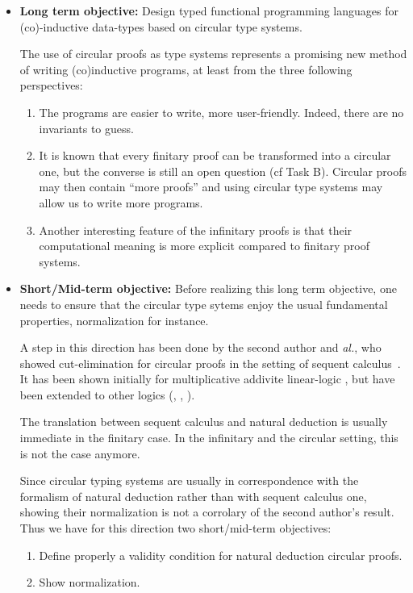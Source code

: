 \begin{itemize}
\item \textbf{Long term objective:} Design typed functional programming languages for (co)-inductive data-types based on circular type systems.

  \bigskip
The use of circular proofs as type systems represents a promising new
method of writing (co)inductive programs, at least from the three following perspectives:
  
\begin{enumerate}
\item The programs are easier to write, more user-friendly. Indeed, there are no invariants to guess.
\item It is known that every finitary proof can be transformed into a circular one, but the converse is still an open question (cf Task B).
Circular proofs may then contain ``more proofs'' and using circular type systems may allow us to write more programs.
  \item Another interesting feature of the infinitary proofs is that their computational meaning is more explicit compared to finitary proof systems.
\end{enumerate}

  
\item \textbf{Short/Mid-term objective:} Before realizing this long term objective, one needs to ensure that the circular type sytems
  enjoy the usual fundamental properties, normalization for instance.

  A step in this direction has been done by the second author and \textit{al.},  who showed cut-elimination for circular proofs in the setting of sequent calculus~\cite{}. It has been shown initially for multiplicative addivite linear-logic \MALL, but have been extended to other logics (\LL, \LK, \LJ).


  The translation between sequent calculus and
natural deduction is usually immediate in the finitary case. In the infinitary and the circular
setting, this is not the case anymore.


 Since circular typing systems  are usually in correspondence with the
formalism of natural deduction rather than with sequent calculus one, 
showing their normalization is not a corrolary of the second author's result.
Thus we have for this direction two short/mid-term objectives:
  \begin{enumerate}
  \item Define properly  a validity condition for natural deduction circular proofs.
    \item Show normalization.
    \end{enumerate}

  \end{itemize}

